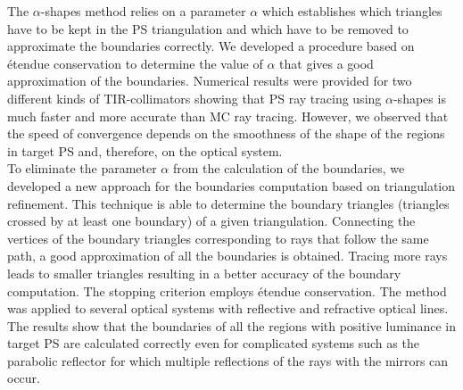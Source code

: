The $\alpha$-shapes method relies on a parameter $\alpha$ which establishes which triangles have to be kept in the PS triangulation and which have to be removed to approximate the boundaries correctly. We developed a procedure based on \'{e}tendue conservation to determine the value of $\alpha$ that gives a good approximation of the boundaries.
Numerical results were provided for two different kinds of TIR-collimators showing that PS ray tracing using $\alpha$-shapes is much faster and more accurate than MC ray tracing. However, we observed that the speed of convergence depends on the smoothness of the shape of the regions in target PS and, therefore, on the optical system. \\ \indent To eliminate the parameter $\alpha$ from the calculation of the boundaries, we developed a new approach for the boundaries computation based on triangulation refinement. 
This technique is able to determine the boundary triangles (triangles crossed by at least one boundary) of a given triangulation. Connecting the vertices of the boundary triangles corresponding to rays that follow the same path, a good approximation of all the boundaries is obtained. Tracing more rays leads to smaller triangles resulting in a better accuracy of the boundary computation. The stopping criterion employs \'{e}tendue conservation. 
The method was applied to several optical systems with reflective and refractive optical lines. The results show that the boundaries of all the regions with positive luminance in target PS are calculated correctly even for complicated systems such as the parabolic reflector for which multiple reflections of the rays with the mirrors can occur. 

